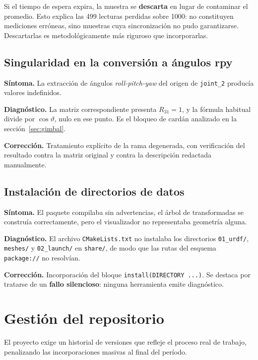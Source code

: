 \documentclass[11pt,a4paper]{article}
\begin{document}
Si el tiempo de espera expira, la muestra se \textbf{descarta} en lugar
de contaminar el promedio. Esto explica las 499 lecturas perdidas sobre
1000: no constituyen mediciones erróneas, sino muestras cuya
sincronización no pudo garantizarse. Descartarlas es metodológicamente
más riguroso que incorporarlas.

\subsection{Singularidad en la conversión a ángulos rpy}

\textbf{Síntoma.} La extracción de ángulos \emph{roll-pitch-yaw} del
origen de \texttt{joint\_2} producía valores indefinidos.

\textbf{Diagnóstico.} La matriz correspondiente presenta $R_{31} = 1$, y
la fórmula habitual divide por $\cos\vartheta$, nulo en ese punto. Es el
bloqueo de cardán analizado en la sección~\ref{sec:gimbal}.

\textbf{Corrección.} Tratamiento explícito de la rama degenerada, con
verificación del resultado contra la matriz original y contra la
descripción redactada manualmente.

\subsection{Instalación de directorios de datos}

\textbf{Síntoma.} El paquete compilaba sin advertencias, el árbol de
transformadas se construía correctamente, pero el visualizador no
representaba geometría alguna.

\textbf{Diagnóstico.} El archivo \texttt{CMakeLists.txt} no instalaba
los directorios \texttt{01_urdf/}, \texttt{meshes/} y \texttt{02_launch/} en
\texttt{share/}, de modo que las rutas del esquema \texttt{package://}
no resolvían.

\textbf{Corrección.} Incorporación del bloque
\texttt{install(DIRECTORY ...)}. Se destaca por tratarse de un
\textbf{fallo silencioso}: ninguna herramienta emite diagnóstico.

\section{Gestión del repositorio}

El proyecto exige un historial de versiones que refleje el proceso real
de trabajo, penalizando las incorporaciones masivas al final del
período.
\end{document}

